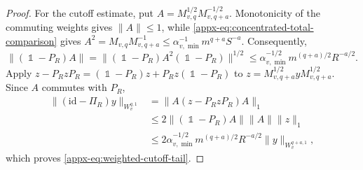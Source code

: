 \documentclass[11pt]{article}
\theoremstyle{myplain}
\theoremstyle{mydefinition}
\theoremstyle{remark}
\DeclareMathOperator{\1}{\mathds{1}}
\begin{document}
\begin{proof}
        For the cutoff estimate, put $A = M_{v,q}^{1/2} M_{v,q+a}^{-1/2}$. Monotonicity of the commuting weights gives $\|A\| \leq 1$, while \eqref{appx-eq:concentrated-total-comparison} gives $A^2=M_{v,q}M_{v,q+a}^{-1}\leq\alpha_{v,\min}^{-1}m^{q+a}S^{-a}$. Consequently,
        \begin{equation*}
            \|(\1 - P_R)A\| =\| (\1-P_R)A^2(\1-P_R)\|^{1/2} \leq \alpha_{v,\min}^{-1/2} m^{(q+a)/2} R^{-a/2}.
        \end{equation*}
        Apply $z-P_RzP_R=(\1-P_R)z+P_Rz(\1-P_R)$ to $z=M_{v,q+a}^{1/2}yM_{v,q+a}^{1/2}$. Since $A$ commutes with $P_R$,
        \begin{equation*}
            \begin{aligned}
                \|(\mathrm{id}-\Pi_R)y\|_{W_v^{q,1}}
                &=\|A(z-P_RzP_R)A\|_1\\
                &\leq2\|(\1-P_R)A\|\|A\|\|z\|_1\\
                &\leq2\alpha_{v,\min}^{-1/2}m^{(q+a)/2}R^{-a/2}
                \|y\|_{W_v^{q+a,1}},
            \end{aligned}
        \end{equation*}
        which proves \eqref{appx-eq:weighted-cutoff-tail}.

  
    \end{proof}
\end{document}
